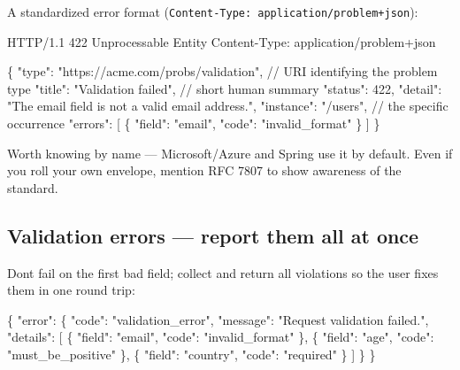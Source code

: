 \documentclass[11pt]{article}
\newenvironment{Shaded}{\begin{snugshade}}{\end{snugshade}}
\newcommand{\DataTypeTok}[1]{\textcolor[rgb]{0.16,0.50,0.73}{#1}}
\newcommand{\FunctionTok}[1]{\textcolor[rgb]{0.56,0.27,0.68}{#1}}
\newcommand{\NormalTok}[1]{\textcolor[rgb]{0.81,0.81,0.76}{#1}}
\newcommand{\OtherTok}[1]{\textcolor[rgb]{0.15,0.68,0.38}{#1}}
\newcommand{\StringTok}[1]{\textcolor[rgb]{0.96,0.31,0.31}{#1}}
\begin{document}
A standardized error format (\texttt{Content-Type:\ application/problem+json}):


\begin{Shaded}
\begin{Highlighting}[]
\NormalTok{HTTP/1.1 422 Unprocessable Entity}
\NormalTok{Content{-}Type: application/problem+json}

\NormalTok{\{}
\NormalTok{  "type": "https://acme.com/probs/validation",   // URI identifying the problem type}
\NormalTok{  "title": "Validation failed",                    // short human summary}
\NormalTok{  "status": 422,}
\NormalTok{  "detail": "The \textquotesingle{}email\textquotesingle{} field is not a valid email address.",}
\NormalTok{  "instance": "/users",                            // the specific occurrence}
\NormalTok{  "errors": [ \{ "field": "email", "code": "invalid\_format" \} ]}
\NormalTok{\}}
\end{Highlighting}
\end{Shaded}

Worth knowing by name --- Microsoft/Azure and Spring use it by default. Even if you roll your own envelope, mention RFC 7807 to show awareness of the standard.

\subsection{Validation errors --- report them all at once}\label{validation-errors--report-them-all-at-once}

Don\textquotesingle t fail on the first bad field; collect and return all violations so the user fixes them in one round trip:


\begin{Shaded}
\begin{Highlighting}[]
\FunctionTok{\{}
  \DataTypeTok{"error"}\FunctionTok{:} \FunctionTok{\{}
    \DataTypeTok{"code"}\FunctionTok{:} \StringTok{"validation\_error"}\FunctionTok{,}
    \DataTypeTok{"message"}\FunctionTok{:} \StringTok{"Request validation failed."}\FunctionTok{,}
    \DataTypeTok{"details"}\FunctionTok{:} \OtherTok{[}
      \FunctionTok{\{} \DataTypeTok{"field"}\FunctionTok{:} \StringTok{"email"}\FunctionTok{,}    \DataTypeTok{"code"}\FunctionTok{:} \StringTok{"invalid\_format"} \FunctionTok{\}}\OtherTok{,}
      \FunctionTok{\{} \DataTypeTok{"field"}\FunctionTok{:} \StringTok{"age"}\FunctionTok{,}      \DataTypeTok{"code"}\FunctionTok{:} \StringTok{"must\_be\_positive"} \FunctionTok{\}}\OtherTok{,}
      \FunctionTok{\{} \DataTypeTok{"field"}\FunctionTok{:} \StringTok{"country"}\FunctionTok{,}  \DataTypeTok{"code"}\FunctionTok{:} \StringTok{"required"} \FunctionTok{\}}
    \OtherTok{]}
  \FunctionTok{\}}
\FunctionTok{\}}
\end{Highlighting}
\end{Shaded}
\end{document}
